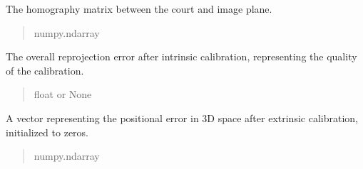 \documentclass[letterpaper,10pt,english]{sphinxmanual}
\begin{document}
\begin{fulllineitems}
\begin{fulllineitems}
\begin{quote}
\begin{description}
\end{description}\end{quote}

\end{fulllineitems}


\begin{fulllineitems}
\label{\detokenize{CameraUtils:CameraUtils.Camera.H_mtx}}
\pysigstartsignatures
{}
\pysigstopsignatures
\sphinxAtStartPar
The homography matrix between the court and image plane.
\begin{quote}\begin{description}
\sphinxAtStartPar
numpy.ndarray

\end{description}\end{quote}

\end{fulllineitems}


\begin{fulllineitems}
\label{\detokenize{CameraUtils:CameraUtils.Camera.rep_err}}
\pysigstartsignatures
{}
\pysigstopsignatures
\sphinxAtStartPar
The overall reprojection error after intrinsic calibration, representing the quality of the calibration.
\begin{quote}\begin{description}
\sphinxAtStartPar
float or None

\end{description}\end{quote}

\end{fulllineitems}


\begin{fulllineitems}
\label{\detokenize{CameraUtils:CameraUtils.Camera.pos_err}}
\pysigstartsignatures
{}
\pysigstopsignatures
\sphinxAtStartPar
A vector representing the positional error in 3D space after extrinsic calibration, initialized to zeros.
\begin{quote}\begin{description}
\sphinxAtStartPar
numpy.ndarray


\end{description}
\end{quote}
\end{fulllineitems}
\end{fulllineitems}
\end{document}
